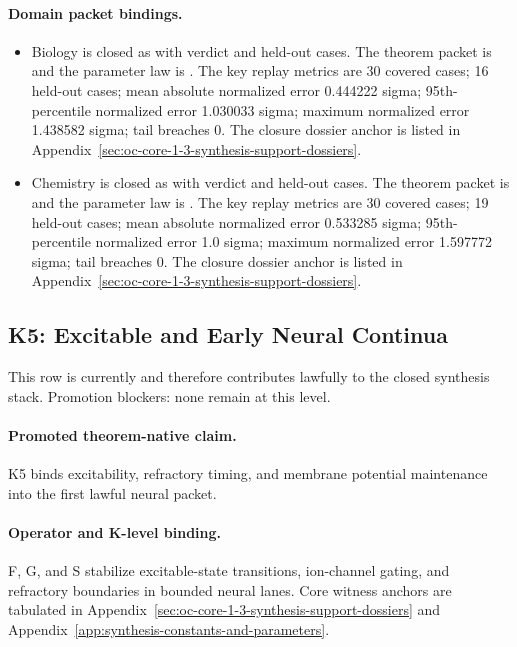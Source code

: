 \paragraph{Domain packet bindings.}
\begin{itemize}[leftmargin=1.6em,nosep]
\item Biology is closed as  with verdict  and  held-out cases. The theorem packet is  and the parameter law is . The key replay metrics are 30 covered cases; 16 held-out cases; mean absolute normalized error 0.444222 sigma; 95th-percentile normalized error 1.030033 sigma; maximum normalized error 1.438582 sigma; tail breaches 0. The closure dossier anchor is listed in Appendix~\ref{sec:oc-core-1-3-synthesis-support-dossiers}.
\item Chemistry is closed as  with verdict  and  held-out cases. The theorem packet is  and the parameter law is . The key replay metrics are 30 covered cases; 19 held-out cases; mean absolute normalized error 0.533285 sigma; 95th-percentile normalized error 1.0 sigma; maximum normalized error 1.597772 sigma; tail breaches 0. The closure dossier anchor is listed in Appendix~\ref{sec:oc-core-1-3-synthesis-support-dossiers}.
\end{itemize}

\subsection{K5: Excitable and Early Neural Continua}
\label{sec:oc-core-1-3-synthesis-k5}
This row is currently  and therefore contributes lawfully to the closed synthesis stack.
Promotion blockers: none remain at this level.

\paragraph{Promoted theorem-native claim.}
K5 binds excitability, refractory timing, and membrane potential maintenance into the first lawful neural packet.

\paragraph{Operator and K-level binding.}
F, G, and S stabilize excitable-state transitions, ion-channel gating, and refractory boundaries in bounded neural lanes.
Core witness anchors are tabulated in Appendix~\ref{sec:oc-core-1-3-synthesis-support-dossiers} and Appendix~\ref{app:synthesis-constants-and-parameters}.

